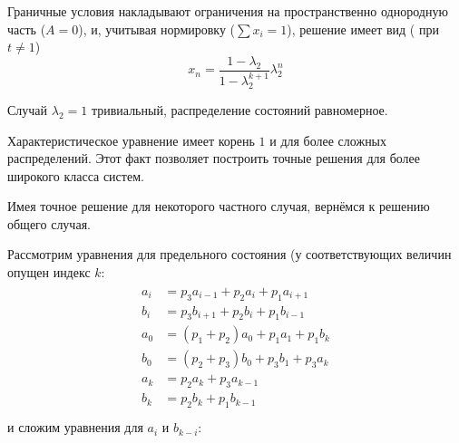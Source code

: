 Граничные условия накладывают ограничения на пространственно однородную часть ($A=0$), и, учитывая нормировку ($\sum x_i=1$), решение имеет вид ( при $t\neq 1$)
\begin{equation}
\label{sol}
x_n = \frac{1-\lambda_2}{1-\lambda_2^{k+1}} \lambda_2^n
\end{equation}

Случай $\lambda_2=1$ тривиальный, распределение состояний равномерное.
\begin{zam}
	Характеристическое уравнение имеет корень $1$ и для более сложных распределений. Этот факт позволяет построить точные решения для более широкого класса систем.
\end{zam}

Имея точное решение для некоторого частного случая, вернёмся к решению  общего случая.

Рассмотрим уравнения для предельного состояния (у соответствующих величин опущен индекс $k$:
\begin{align}
\begin{split}
a_i &= p_3 a_{i-1} + p_2 a_i + p_1 a_{i+1}\\
b_i &= p_3 b_{i+1} + p_2 b_i + p_1 b_{i-1}\\
a_0 &= (p_1 + p_2) a_0 + p_1 a_1 + p_1 b_k\\
b_0 &= (p_2 + p_3) b_0 + p_3 b_1 + p_3 a_k \\
a_k &= p_2 a_k + p_3 a_{k-1}\\
b_k &= p_2 b_k + p_1 b_{k-1}\\
\end{split}
\end{align}
и сложим уравнения для $a_i$ и $b_{k-i}$:
\vspace{1cm}

